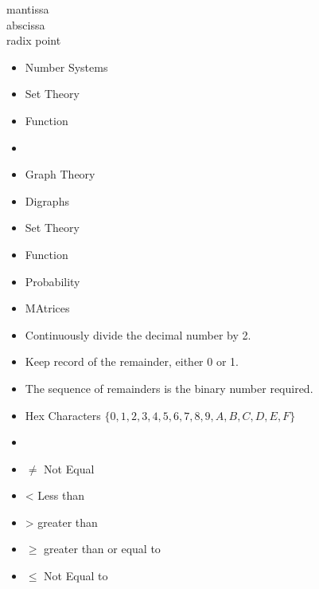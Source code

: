 \documentclass[]{report}
\begin{document}
\begin{description}
\item[mantissa]
\item[abscissa]
\item[radix point]
\end{description}

\begin{itemize}
\item Number Systems
\item Set Theory
\item Function
\item 
\item Graph Theory
\end{itemize}



\begin{itemize}
\item Digraphs
\item Set Theory
\item Function
\item Probability
\item MAtrices
\end{itemize}



\begin{itemize}
\item Continuously divide the decimal number by 2.
\item Keep record of the remainder, either 0 or 1.
\item The sequence of remainders is the binary number required.
\end{itemize}


\begin{itemize}
\item Hex Characters $\{0,1,2,3,4,5,6,7,8,9,A,B,C,D,E,F\}$
\item 
\end{itemize}


\begin{itemize}
\item $\neq$ Not Equal
\item < Less than
\item > greater than
\item $\geq$ greater than or equal to
\item $\leq$ Not Equal to
\end{itemize}
\end{document}
